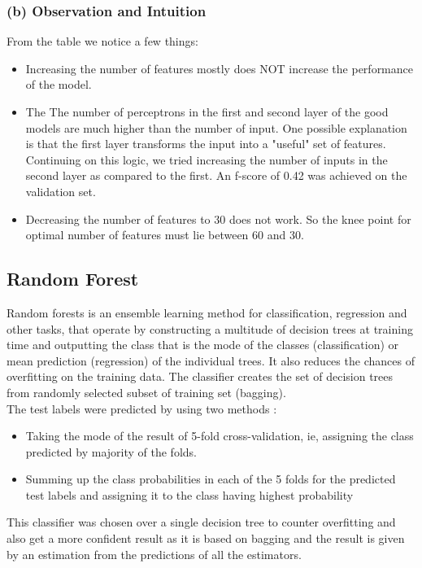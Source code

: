 \documentclass[12pt]{report}
\begin{document}
\newpage
\subsubsection{(b) Observation and Intuition}
From the table we notice a few things:
\begin{itemize}
    \item Increasing the number of features mostly does NOT increase the performance of the model.
    \item The The number of perceptrons in the first and second layer of the good models are much higher than the number of input. One possible explanation is that the first layer transforms the input into a "useful" set of features. Continuing on this logic, we tried increasing the number of inputs in the second layer as compared to the first. An f-score of 0.42 was achieved on the validation set.
    \item Decreasing the number of features to 30 does not work. So the knee point for optimal number of features must lie between 60 and 30.
\end{itemize}


\subsection{Random Forest}
Random forests is an ensemble learning method for classification, regression and other tasks, that operate by constructing a multitude of decision trees at training time and outputting the class that is the mode of the classes (classification) or mean prediction (regression) of the individual trees. It also reduces the chances of overfitting on the training data. The classifier creates the set of decision trees from randomly selected subset of training set (bagging).\\

The test labels were predicted by using two methods :
\begin{itemize}
    \item Taking the mode of the result of 5-fold cross-validation, ie, assigning the class predicted by majority of the folds.
    \item Summing up the class probabilities in each of the 5 folds for the predicted test labels and assigning it to the class having highest probability
\end{itemize}

This classifier was chosen over a single decision tree to counter overfitting and also get a more confident result as it is based on bagging and the result is given by an estimation from the predictions of all the estimators.\\
\end{document}
